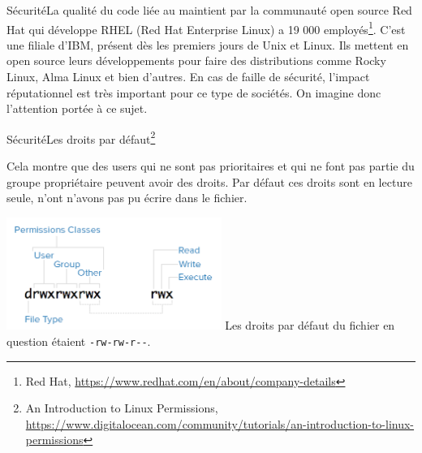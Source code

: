\documentclass{beamer}
\begin{document}
    \begin{frame}{Sécurité}{La qualité du code liée au maintient par la communauté open source}
        Red Hat qui développe RHEL (Red Hat Enterprise Linux) a 19 000 employés\footnote{Red Hat, \url{https://www.redhat.com/en/about/company-details}}.
        \bigbreak
        C'est une filiale d'IBM, présent dès les premiers jours de Unix et Linux.
        \bigbreak
        Ils mettent en open source leurs développements pour faire des distributions comme Rocky Linux, Alma Linux et bien d'autres.
        \bigbreak
        En cas de faille de sécurité, l'impact réputationnel est très important pour ce type de sociétés.
        On imagine donc l'attention portée à ce sujet.
    \end{frame}

    \begin{frame}{Sécurité}{Les droits par défaut\footnote{\label{rights-digitalocean}An Introduction to Linux Permissions, \url{https://www.digitalocean.com/community/tutorials/an-introduction-to-linux-permissions}}}
        \begin{dangercolorbox}
            Cela montre que des users qui ne sont pas prioritaires et qui ne font pas partie du groupe propriétaire peuvent avoir des droits.
            Par défaut ces droits sont en lecture seule, n'ont n'avons pas pu écrire dans le fichier.
        \end{dangercolorbox}
        \centering
        \includegraphics[width=7cm]{image/permission-classes}
        \flushleft
        Les droits par défaut du fichier en question étaient \lstinline{-rw-rw-r--}.
    \end{frame}
\end{document}

